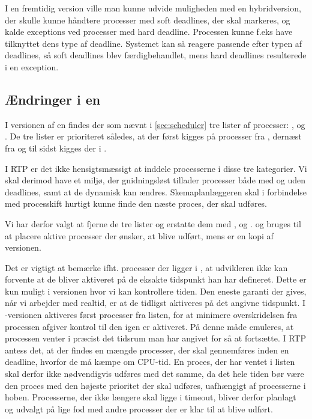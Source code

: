 I en fremtidig version ville man kunne udvide muligheden med en hybridversion, der skulle kunne håndtere processer med soft deadlines, der skal markeres, og kalde exceptions ved processer med hard deadline. Processen kunne f.eks have tilknyttet dens type af deadline. Systemet kan så reagere passende efter typen af deadlines, så soft deadlines blev færdigbehandlet, mens hard deadlines resulterede i en exception.


\subsection{Ændringer i \sched en}
\label{sec:sched-changes}
I  versionen af \sched en findes der som nævnt i \cref{sec:scheduler} tre lister af processer: ,  og . De tre lister er prioriteret således, at der først kigges på processer fra , dernæst fra  og til sidst kigges der i .

I RTP er det ikke hensigtsmæssigt at inddele processerne i disse tre  kategorier. Vi skal derimod have et miljø, der gnidningsløst tillader processer både med og uden deadlines, samt at de dynamisk kan ændres. Skemaplanlæggeren skal i forbindelse med processkift hurtigt kunne finde den næste proces, der skal udføres.

Vi har derfor valgt at fjerne  de tre lister og erstatte dem  med ,   og .  og    bruges til at placere  aktive processer der ønsker, at blive udført, mens   er en kopi af \des versionen. 

Det er vigtigt at bemærke ifht. processer der ligger i , at udvikleren ikke kan forvente at de bliver aktiveret på de eksakte tidspunkt han har defineret. Dette er kun muligt i \des versionen hvor vi kan kontrollere tiden. Den eneste garanti der gives, når vi arbejder med realtid, er at de tidligst aktiveres på det angivne tidspunkt. I -versionen  aktiveres først processer fra  listen, for at minimere overskridelsen fra processen afgiver kontrol til den igen er aktiveret. På denne måde emuleres, at processen venter i præcist det tidsrum man har angivet for så at fortsætte. I RTP antess det, at der findes en mængde processer, der skal gennemføres inden en deadline, hvorfor de må kæmpe om CPU-tid. En proces, der har ventet i  listen skal derfor ikke nødvendigvis udføres med det samme, da det hele tiden bør være den proces med den højeste prioritet der skal udføres, uafhængigt af processerne i  hoben. Processerne, der ikke længere skal ligge i timeout, bliver derfor planlagt og udvalgt på lige fod med andre processer der er klar til at blive udført. 

